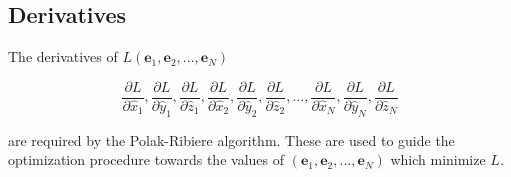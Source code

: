 \documentclass[12pt,double]{article}
\begin{document}

\vspace{2em}
\subsection*{Derivatives}

\label{sec-Appendix-derivatives_ofL}

The derivatives of $L(\mathbf{e}_1,\mathbf{e}_2,...,\mathbf{e}_N)$
\begin{linenomath*} \begin{equation}
\frac{\partial L}{\partial \hat{x}_1},
\frac{\partial L}{\partial \hat{y}_1},
 \frac{\partial L}{\partial \hat{z}_1},
\frac{\partial L}{\partial \hat{x}_2},
\frac{\partial L}{\partial \hat{y}_2},
\frac{\partial L}{\partial \hat{z}_2},
...,
\frac{\partial L}{\partial \hat{x}_N},
\frac{\partial L}{\partial \hat{y}_N},
\frac{\partial L}{\partial \hat{z}_N}
\end{equation} \end{linenomath*}
are required by the Polak-Ribiere algorithm. These are used to guide
the optimization procedure towards the values of
$(\mathbf{e}_1,\mathbf{e}_2,...,\mathbf{e}_N)$ which minimize $L$.
\end{document}
